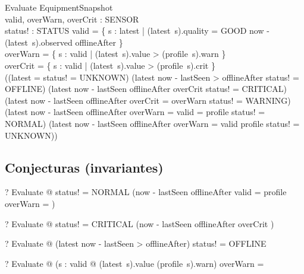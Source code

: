 \documentclass{article}
\begin{document}
\begin{schema}{Evaluate}
  \Xi EquipmentSnapshot \\
  valid, overWarn, overCrit : \power SENSOR \\
  status! : STATUS
\where
  valid = \{ s : \dom latest |
       (latest~s).quality = GOOD \land now - (latest~s).observed \leq offlineAfter \} \\
  overWarn = \{ s : valid | (latest~s).value > (profile~s).warn \} \\
  overCrit = \{ s : valid | (latest~s).value > (profile~s).crit \} \\
  ((\dom latest = \emptyset \land status! = UNKNOWN)
  \lor (\dom latest \neq \emptyset \land now - lastSeen > offlineAfter
        \land status! = OFFLINE)
  \lor (\dom latest \neq \emptyset \land now - lastSeen \leq offlineAfter
        \land overCrit \neq \emptyset \land status! = CRITICAL)
  \lor (\dom latest \neq \emptyset \land now - lastSeen \leq offlineAfter
        \land overCrit = \emptyset \land overWarn \neq \emptyset
        \land status! = WARNING)
  \lor (\dom latest \neq \emptyset \land now - lastSeen \leq offlineAfter
        \land overWarn = \emptyset \land valid = \dom profile
        \land status! = NORMAL)
  \lor (\dom latest \neq \emptyset \land now - lastSeen \leq offlineAfter
        \land overWarn = \emptyset \land valid \neq \dom profile
        \land status! = UNKNOWN))
\end{schema}

\subsection*{Conjecturas (invariantes)}

\begin{zed}
  \vdash? \forall Evaluate @ status! = NORMAL \implies
    (now - lastSeen \leq offlineAfter \land valid = \dom profile
     \land overWarn = \emptyset)
\end{zed}

\begin{zed}
  \vdash? \forall Evaluate @ status! = CRITICAL \implies
    (now - lastSeen \leq offlineAfter \land overCrit \neq \emptyset)
\end{zed}

\begin{zed}
  \vdash? \forall Evaluate @ (\dom latest \neq \emptyset \land now - lastSeen > offlineAfter)
    \implies status! = OFFLINE
\end{zed}

\begin{zed}
  \vdash? \forall Evaluate @ (\forall s : valid @ (latest~s).value \leq (profile~s).warn)
    \implies overWarn = \emptyset
\end{zed}
\end{document}
